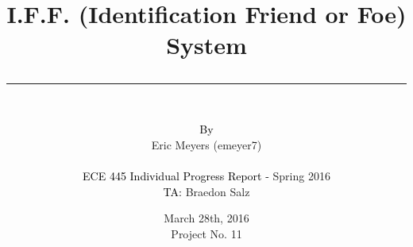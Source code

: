 \documentclass[letterpaper,10pt]{article}
\author{\vspace{.4in}\\
	\textcolor{black}{By}\\
	#1
	\vspace{1in}\\
	\textcolor{black}{ECE 445 Individual Progress Report -} #2\\
	\textcolor{black}{TA:} #3
	\vspace{1in}}
\newcommand{\thetitle}[1]{\title{\begin{huge}{\bf #1}\end{huge} \color{subtitlecolor}\rule[25pt]{\textwidth}{1pt}}}
\newcommand{\theauthor}[3]{
	\author{\vspace{.4in}\\
	\textcolor{black}{By}\\
	#1
	\vspace{1in}\\
	\textcolor{black}{ECE 445 Individual Progress Report -} #2\\
	\textcolor{black}{TA:} #3
	\vspace{1in}}
}
\begin{document}
\pagestyle{empty}
\doublespacing

\thetitle{{I.F.F. (Identification Friend or Foe) System}}

\theauthor{
	{Eric Meyers (emeyer7)}\\
}
{ %
	{Spring 2016}
}
{ %
	{Braedon Salz}
}

\date{
{March 28th, 2016}\\
Project No. 11
\clearpage
}

\maketitle
\pagestyle{fancy}
\end{document}
